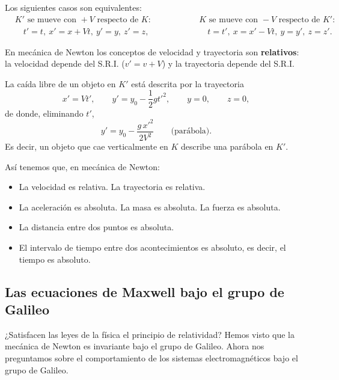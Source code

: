 \begin{observacion}
Los siguientes casos son equivalentes:
\[
\begin{aligned}
&K' \text{ se mueve con } +V \text{ respecto de } K: \\
&\quad t'=t,\ x'=x+Vt,\ y'=y,\ z'=z,
\end{aligned}
\qquad\qquad
\begin{aligned}
&K \text{ se mueve con } -V \text{ respecto de } K': \\
&\quad t=t',\ x=x'-Vt,\ y=y',\ z=z'.
\end{aligned}
\]
\end{observacion}

En mecánica de Newton los conceptos de velocidad y trayectoria son
\textbf{relativos}: la velocidad depende del S.R.I. ($v'=v+V$) y la
trayectoria depende del S.R.I.

\begin{ejemplo}
La caída libre de un objeto en $K'$ está descrita por la trayectoria
\[
x'=Vt', \qquad y'=y_0-\frac12 gt'^2, \qquad y=0, \qquad z=0,
\]
de donde, eliminando $t'$,
\[
y' = y_0 - \frac{g\,x'^2}{2V^2} \qquad \text{(parábola)}.
\]
Es decir, un objeto que cae verticalmente en $K$ describe una parábola
en $K'$.
\end{ejemplo}

Así tenemos que, en mecánica de Newton:
\begin{itemize}
\item La velocidad es relativa. \qquad La trayectoria es relativa.
\item La aceleración es absoluta. \qquad La masa es absoluta. \qquad La
fuerza es absoluta.
\item La distancia entre dos puntos es absoluta.
\item El intervalo de tiempo entre dos acontecimientos es absoluto, es
decir, el tiempo es absoluto.
\end{itemize}

\subsection{Las ecuaciones de Maxwell bajo el grupo de Galileo}

¿Satisfacen las leyes de la física el principio de relatividad? Hemos
visto que la mecánica de Newton es invariante bajo el grupo de Galileo.
Ahora nos preguntamos sobre el comportamiento de los sistemas
electromagnéticos bajo el grupo de Galileo.


